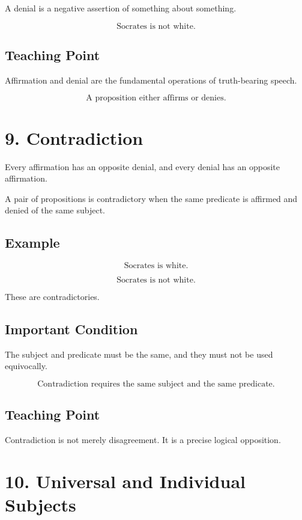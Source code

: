 \documentclass[12pt]{article}
\begin{document}
A denial is a negative assertion of something about something.

\[
\text{Socrates is not white.}
\]

\subsection*{Teaching Point}

Affirmation and denial are the fundamental operations of truth-bearing speech.

\[
\boxed{
\text{A proposition either affirms or denies.}
}
\]

\section*{9. Contradiction}

Every affirmation has an opposite denial, and every denial has an opposite
affirmation.

A pair of propositions is contradictory when the same predicate is affirmed and
denied of the same subject.

\subsection*{Example}

\[
\text{Socrates is white.}
\]

\[
\text{Socrates is not white.}
\]

These are contradictories.

\subsection*{Important Condition}

The subject and predicate must be the same, and they must not be used
equivocally.

\[
\boxed{
\text{Contradiction requires the same subject and the same predicate.}
}
\]

\subsection*{Teaching Point}

Contradiction is not merely disagreement. It is a precise logical opposition.

\section*{10. Universal and Individual Subjects}
\end{document}
